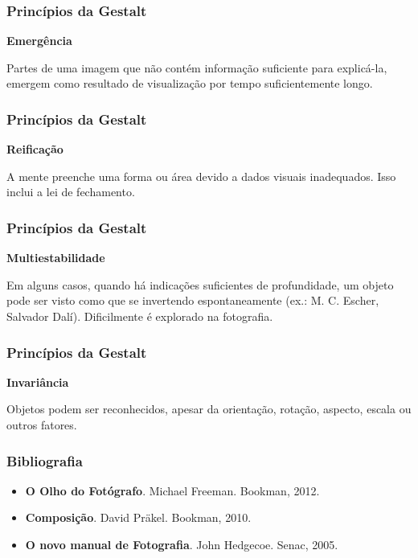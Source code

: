 \begin{frame}
    \frametitle{Princípios da Gestalt}
    {\textbf{\large Emergência}}
    \vspace{1cm}

    Partes de uma imagem que não contém informação suficiente para explicá-la,
    emergem como resultado de visualização por tempo suficientemente longo.
\end{frame}

\begin{frame}
  \frametitle{Princípios da Gestalt}
  {\textbf{\large Reificação}}
  \vspace{1cm}

  A mente preenche uma forma ou área devido a dados visuais inadequados. Isso
  inclui a lei de fechamento.
\end{frame}

\begin{frame}
  \frametitle{Princípios da Gestalt}
  {\textbf{\large Multiestabilidade}}
  \vspace{1cm}

  Em alguns casos, quando há indicações suficientes de profundidade, um objeto
  pode ser visto como que se invertendo espontaneamente (ex.: M. C. Escher,
  Salvador Dalí). Dificilmente é explorado na fotografia.
\end{frame}

\begin{frame}
  \frametitle{Princípios da Gestalt}
  {\textbf{\large Invariância}}
  \vspace{1cm}

  Objetos podem ser reconhecidos, apesar da orientação, rotação, aspecto, escala
  ou outros fatores.
\end{frame}



\begin{frame}
    \frametitle{Bibliografia}
    \begin{itemize}
      \item \textbf{O Olho do Fotógrafo}. Michael Freeman. Bookman, 2012.
      \item \textbf{Composição}. David Präkel. Bookman, 2010.
      \item \textbf{O novo manual de Fotografia}. John Hedgecoe. Senac, 2005.
    \end{itemize}
\end{frame}


